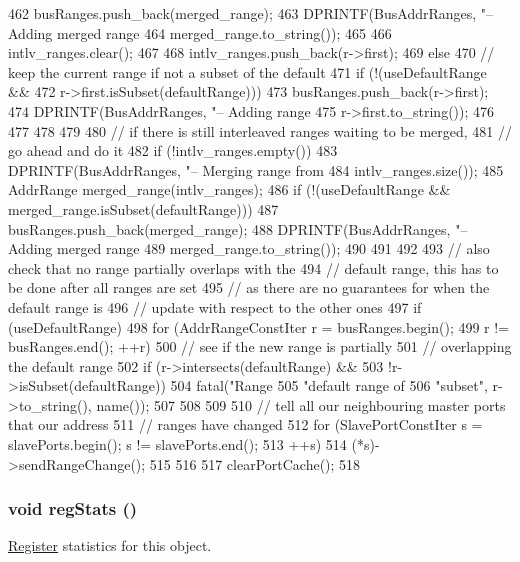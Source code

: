 \begin{DoxyCode}
{{{{{{462                         busRanges.push_back(merged_range);
463                         DPRINTF(BusAddrRanges, "-- Adding merged range %
464                                 merged_range.to_string());
465                     }
466                     intlv_ranges.clear();
467                 }
468                 intlv_ranges.push_back(r->first);
469             } else {
470                 // keep the current range if not a subset of the default
471                 if (!(useDefaultRange &&
472                       r->first.isSubset(defaultRange))) {
473                     busRanges.push_back(r->first);
474                     DPRINTF(BusAddrRanges, "-- Adding range %
475                             r->first.to_string());
476                 }
477             }
478         }
479 
480         // if there is still interleaved ranges waiting to be merged,
481         // go ahead and do it
482         if (!intlv_ranges.empty()) {
483             DPRINTF(BusAddrRanges, "-- Merging range from %
484                     intlv_ranges.size());
485             AddrRange merged_range(intlv_ranges);
486             if (!(useDefaultRange && merged_range.isSubset(defaultRange))) {
487                 busRanges.push_back(merged_range);
488                 DPRINTF(BusAddrRanges, "-- Adding merged range %
489                         merged_range.to_string());
490             }
491         }
492 
493         // also check that no range partially overlaps with the
494         // default range, this has to be done after all ranges are set
495         // as there are no guarantees for when the default range is
496         // update with respect to the other ones
497         if (useDefaultRange) {
498             for (AddrRangeConstIter r = busRanges.begin();
499                  r != busRanges.end(); ++r) {
500                 // see if the new range is partially
501                 // overlapping the default range
502                 if (r->intersects(defaultRange) &&
503                     !r->isSubset(defaultRange))
504                     fatal("Range %
505                           "default range of %
506                           "subset\n", r->to_string(), name());
507             }
508         }
509 
510         // tell all our neighbouring master ports that our address
511         // ranges have changed
512         for (SlavePortConstIter s = slavePorts.begin(); s != slavePorts.end();
513              ++s)
514             (*s)->sendRangeChange();
515     }
516 
517     clearPortCache();
518 }
\end{DoxyCode}
\hypertarget{classBaseBus_a4dc637449366fcdfc4e764cdf12d9b11}{
\subsubsection[{regStats}]{\setlength{\rightskip}{0pt plus 5cm}void regStats ()}}
\label{classBaseBus_a4dc637449366fcdfc4e764cdf12d9b11}
\hyperlink{classRegister}{Register} statistics for this object. 

